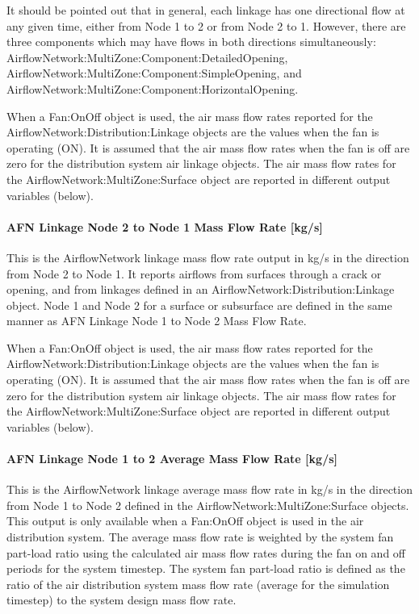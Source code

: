 It should be pointed out that in general, each linkage has one directional flow at any given time, either from Node 1 to 2 or from Node 2 to 1. However, there are three components which may have flows in both directions simultaneously: AirflowNetwork:MultiZone:Component:DetailedOpening, AirflowNetwork:MultiZone:Component:SimpleOpening, and AirflowNetwork:MultiZone:Component:HorizontalOpening.

When a Fan:OnOff object is used, the air mass flow rates reported for the AirflowNetwork:Distribution:Linkage objects are the values when the fan is operating (ON). It is assumed that the air mass flow rates when the fan is off are zero for the distribution system air linkage objects. The air mass flow rates for the AirflowNetwork:MultiZone:Surface object are reported in different output variables (below).

\paragraph{AFN Linkage Node 2 to Node 1 Mass Flow Rate {[}kg/s{]}}\label{afn-linkage-node-2-to-node-1-mass-flow-rate-kgs}

This is the AirflowNetwork linkage mass flow rate output in kg/s in the direction from Node 2 to Node 1. It reports airflows from surfaces through a crack or opening, and from linkages defined in an AirflowNetwork:Distribution:Linkage object. Node 1 and Node 2 for a surface or subsurface are defined in the same manner as AFN Linkage Node 1 to Node 2 Mass Flow Rate.

When a Fan:OnOff object is used, the air mass flow rates reported for the AirflowNetwork:Distribution:Linkage objects are the values when the fan is operating (ON). It is assumed that the air mass flow rates when the fan is off are zero for the distribution system air linkage objects. The air mass flow rates for the AirflowNetwork:MultiZone:Surface object are reported in different output variables (below).

\paragraph{AFN Linkage Node 1 to 2 Average Mass Flow Rate {[}kg/s{]}}\label{afn-linkage-node-1-to-2-average-mass-flow-rate-kgs}

This is the AirflowNetwork linkage average mass flow rate in kg/s in the direction from Node 1 to Node 2 defined in the AirflowNetwork:MultiZone:Surface objects. This output is only available when a Fan:OnOff object is used in the air distribution system. The average mass flow rate is weighted by the system fan part-load ratio using the calculated air mass flow rates during the fan on and off periods for the system timestep. The system fan part-load ratio is defined as the ratio of the air distribution system mass flow rate (average for the simulation timestep) to the system design mass flow rate.

